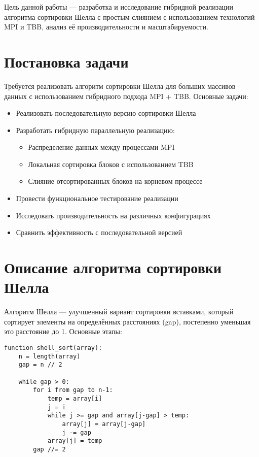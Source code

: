 \documentclass[a4paper,12pt]{article}
\begin{document}
Цель данной работы — разработка и исследование гибридной реализации алгоритма сортировки Шелла с простым слиянием с использованием технологий MPI и TBB, анализ её производительности и масштабируемости.

\section*{Постановка задачи}
Требуется реализовать алгоритм сортировки Шелла для больших массивов данных с использованием гибридного подхода MPI + TBB. Основные задачи:

\begin{itemize}
    \item Реализовать последовательную версию сортировки Шелла
    \item Разработать гибридную параллельную реализацию:
    \begin{itemize}
        \item Распределение данных между процессами MPI
        \item Локальная сортировка блоков с использованием TBB
        \item Слияние отсортированных блоков на корневом процессе
    \end{itemize}
    \item Провести функциональное тестирование реализации
    \item Исследовать производительность на различных конфигурациях
    \item Сравнить эффективность с последовательной версией
\end{itemize}

\section*{Описание алгоритма сортировки Шелла}
Алгоритм Шелла — улучшенный вариант сортировки вставками, который сортирует элементы на определённых расстояниях (gap), постепенно уменьшая это расстояние до 1. Основные этапы:

\begin{lstlisting}
function shell_sort(array):
    n = length(array)
    gap = n // 2
    
    while gap > 0:
        for i from gap to n-1:
            temp = array[i]
            j = i
            while j >= gap and array[j-gap] > temp:
                array[j] = array[j-gap]
                j -= gap
            array[j] = temp
        gap //= 2
\end{lstlisting}
\end{document}
